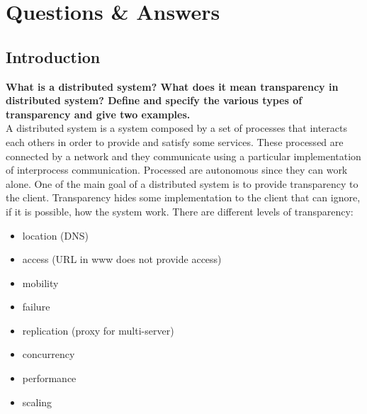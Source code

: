 \section{Questions \& Answers}
\subsection{Introduction}
\textbf{What is a distributed system? What does it mean transparency in distributed system? Define and specify the various types of transparency and give two examples.} \\

A distributed system is a system composed by a set of processes that interacts each others in order to provide and satisfy some services. These processed are connected by a network and they communicate using a particular implementation of interprocess communication. Processed are autonomous since they can work alone. One of the main goal of a distributed system is to provide transparency to the client. Transparency hides some implementation to the client that can ignore, if it is possible, how the system work. There are different levels of transparency:
\begin{itemize}
	\item location (DNS)
	\item access (URL in www does not provide access)
	\item mobility
	\item failure
	\item replication (proxy for multi-server)
	\item concurrency
	\item performance
	\item scaling
\end{itemize}

